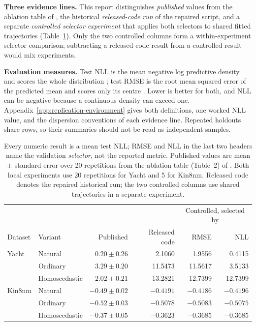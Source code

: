 \textbf{Three evidence lines.}
This report distinguishes \emph{published} values from the ablation table of \citet{duan2020ngboost}, the historical \emph{released-code run} of the repaired script, and a separate \emph{controlled selector experiment} that applies both selectors to shared fitted trajectories (Table~\ref{tab:replication-results}).
Only the two controlled columns form a within-experiment selector comparison; subtracting a released-code result from a controlled result would mix experiments.

\textbf{Evaluation measures.}
Test NLL is the mean negative log predictive density and scores the whole distribution \cite{gneiting2007strictly}; test RMSE is the root mean squared error of the predicted mean and scores only its centre \cite{hyndman2006another}.
Lower is better for both, and NLL can be negative because a continuous density can exceed one.
Appendix~\ref{app:replication-environment} gives both definitions, one worked NLL value, and the dispersion conventions of each evidence line.
Repeated holdouts share rows, so their summaries should not be read as independent samples.

\begin{table}[t]
\centering
\small
\setlength{\tabcolsep}{5pt}
\begin{tabular}{@{}llrrrr@{}}
\toprule
& & & & \multicolumn{2}{c}{Controlled, selected by} \\
Dataset & Variant & Published & Released code & RMSE & NLL \\
\midrule
Yacht & Natural & $0.20\pm0.26$ & 2.1060 & 1.9556 & 0.4115 \\
& Ordinary & $3.29\pm0.20$ & 11.5473 & 11.5617 & 3.5133 \\
& Homoscedastic & $2.02\pm0.21$ & 13.2821 & 12.7399 & 12.7399 \\
\midrule
Kin8nm & Natural & $-0.49\pm0.02$ & $-0.4191$ & $-0.4186$ & $-0.4196$ \\
& Ordinary & $-0.52\pm0.03$ & $-0.5078$ & $-0.5083$ & $-0.5075$ \\
& Homoscedastic & $-0.37\pm0.05$ & $-0.3623$ & $-0.3685$ & $-0.3685$ \\
\bottomrule
\end{tabular}
\caption{Every numeric result is a mean test NLL; RMSE and NLL in the last two headers name the validation \emph{selector}, not the reported metric.
Published values are mean $\pm$ standard error over 20 repetitions from the ablation table (Table~2) of \citet{duan2020ngboost}.
Both local experiments use 20 repetitions for Yacht and 5 for Kin8nm.
Released code denotes the repaired historical run; the two controlled columns use shared trajectories in a separate experiment.}
\label{tab:replication-results}
\end{table}

